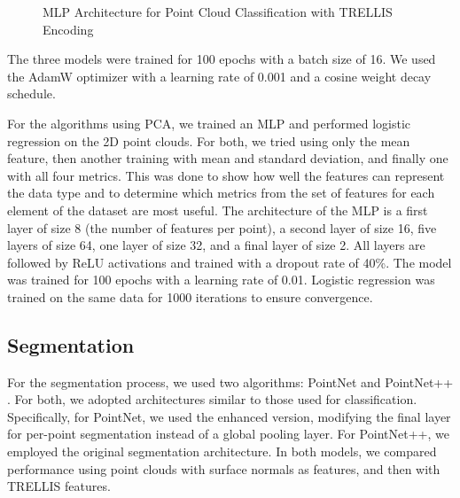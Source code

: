 \documentclass[%
 reprint,
 amsmath,amssymb,
 aps,
 floatfix,
 nofootinbib,
]{revtex4-2}
\begin{document}
\begin{figure}[t]
  \caption{MLP Architecture for Point Cloud Classification with TRELLIS Encoding}
  \label{fig:mlp_architecture}
\end{figure}

The three models were trained for 100 epochs with a batch size of 16. We used the AdamW optimizer with a learning rate of 0.001 and a cosine weight decay schedule.

For the algorithms using PCA, we trained an MLP and performed logistic regression on the 2D point clouds. For both, we tried using only the mean feature, then another training with mean and standard deviation, and finally one with all four metrics. This was done to show how well the features can represent the data type and to determine which metrics from the set of features for each element of the dataset are most useful. The architecture of the MLP is a first layer of size 8 (the number of features per point), a second layer of size 16, five layers of size 64, one layer of size 32, and a final layer of size 2. All layers are followed by ReLU activations and trained with a dropout rate of 40\%. The model was trained for 100 epochs with a learning rate of 0.01. Logistic regression was trained on the same data for 1000 iterations to ensure convergence.


\subsection{Segmentation}

For the segmentation process, we used two algorithms: PointNet \citep{pointnet} and PointNet++ \citep{pointnetpp}. For both, we adopted architectures similar to those used for classification. Specifically, for PointNet, we used the enhanced version, modifying the final layer for per-point segmentation instead of a global pooling layer. For PointNet++, we employed the original segmentation architecture. In both models, we compared performance using point clouds with surface normals as features, and then with TRELLIS features.
\end{document}
